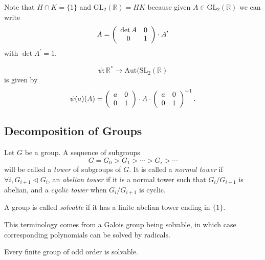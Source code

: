 \documentclass{article}
\begin{document}
\begin{xmpl}
\begin{enumerate}
{        Note that $H \cap K = \{ 1 \}$ and
        $\mathrm{GL}_2(\mathbb{R}) = H K$ because
        given $A \in \mathrm{GL}_2(\mathbb{R})$ we can write
        $$
        A = \left(\begin{array}{c c}
              \det A & 0 \\ 0 & 1
            \end{array}\right) \cdot A^\prime
        $$
        with $\det A^\prime = 1$.

        $$
        \psi : \mathbb{R}^*
           \to \mathrm{Aut}(\mathrm{SL}_2(\mathbb{R})
        $$
        is given by
        $$
        \psi(a)(A) = 
          \left(\begin{array}{c c}
            a & 0 \\ 0 & 1
          \end{array}\right) \cdot A \cdot
          \left(\begin{array}{c c}
            a & 0 \\ 0 & 1
          \end{array}\right)^{-1}.
          $$
       }
\end{enumerate}
\end{xmpl}

\subsection{Decomposition of Groups}

\begin{defn}
Let $G$ be a group. A sequence of subgroups
$$
G = G_0 > G_1 > \cdots > G_i > \cdots
$$ 
will be called a \emph{tower} of subgroups of $G$.
It is called a \emph{normal tower} if 
$\forall i, G_{i+1} \triangleleft G_i$, an
\emph{abelian tower} if it is a normal tower such that
$G_{i} / G_{i+1}$ is abelian, and a \emph{cyclic tower}
when $G_{i} / G_{i+1}$ is cyclic.
\end{defn}

\begin{defn}
A group is called \emph{solvable} if it has a finite
abelian tower ending in $\{ 1 \}$.
\end{defn}

This terminology comes from a Galois group being solvable, in which
case corresponding polynomials can be solved by radicals.

\begin{theorem}
  Every finite group of odd order is solvable.
\end{theorem}
\end{document}
